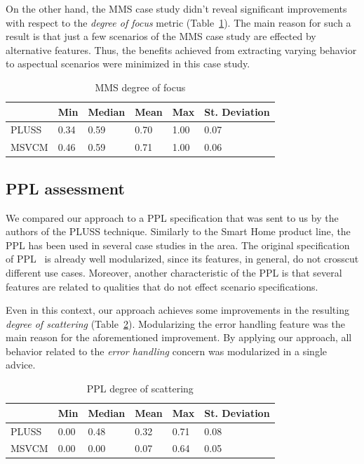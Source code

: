 On the other hand, the MMS case study didn't reveal significant improvements with
respect to the \emph{degree of focus} metric (Table~\ref{tab:mms-dof}). The main reason for such a result is that just a few scenarios of the MMS case study are effected by alternative
features. Thus, the benefits achieved from extracting varying behavior to
aspectual scenarios were minimized in this case study.

\begin{table}[htb] \centering
\caption{MMS degree of focus}
\label{tab:mms-dof}
\begin{small}
\begin{tabular}{llllll} \hline
					& Min 	& Median 	& Mean 	& Max 	& St. Deviation \\ \hline 
	PLUSS			& 0.34	& 0.59		& 0.70	& 1.00	& 0.07			\\
	MSVCM			& 0.46  & 0.59   	& 0.71 	& 1.00 	& 0.06			\\ \hline	
\end{tabular}
\end{small}
\end{table}

\subsection{PPL assessment}

We compared our approach to a PPL specification that was sent to us by the
authors of the PLUSS technique. Similarly to the Smart Home product line, the PPL has been used in several case
studies in the area. The original specification of PPL~\cite{PPL:2008} is already well
modularized, since its features, in general, do not crosscut different
use cases. Moreover, another characteristic of the PPL is that several features
are related to qualities that do not effect scenario specifications.

Even in this context, our approach achieves some improvements in the
resulting \emph{degree of scattering} (Table~\ref{tab:ppl-dos}). Modularizing the error handling feature was the main reason for the
aforementioned improvement. By applying our approach, all behavior related to
the \emph{error handling} concern was modularized in a single advice. 

\begin{table}[htb] \centering
\caption{PPL degree of scattering}
\label{tab:ppl-dos}
\begin{small}
\begin{tabular}{llllll} \hline
					& Min 	& Median 	& Mean 	& Max 	& St. Deviation \\ \hline 
	PLUSS			& 0.00	& 0.48		& 0.32	& 0.71	& 0.08			\\
	MSVCM			& 0.00  & 0.00   	& 0.07 	& 0.64 	& 0.05			\\ \hline	
\end{tabular}
\end{small}
\end{table}




